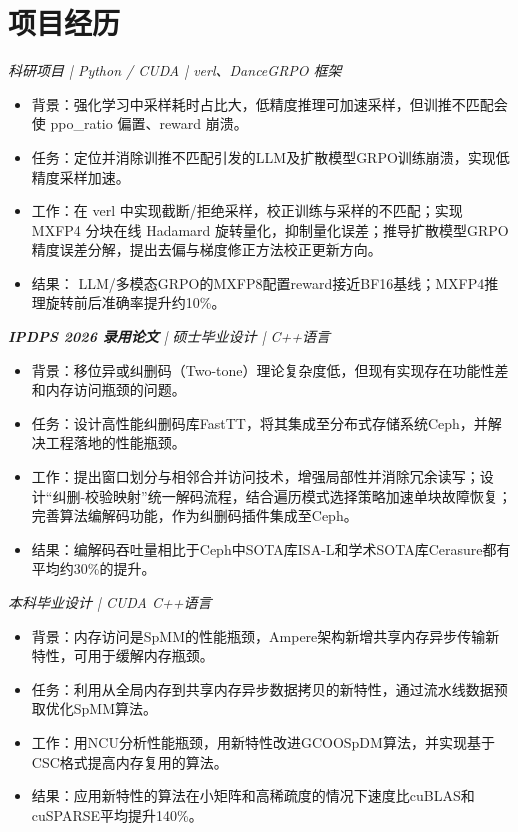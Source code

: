 \documentclass{resume}
\begin{document}
\section{项目经历}
\textit{科研项目 | Python / CUDA | verl、DanceGRPO 框架}
\begin{itemize}
\item 背景：强化学习中采样耗时占比大，低精度推理可加速采样，但训推不匹配会使 ppo\_ratio 偏置、reward 崩溃。
\item 任务：定位并消除训推不匹配引发的LLM及扩散模型GRPO训练崩溃，实现低精度采样加速。
\item 工作：在 verl 中实现截断/拒绝采样，校正训练与采样的不匹配；实现 MXFP4 分块在线 Hadamard 旋转量化，抑制量化误差；推导扩散模型GRPO精度误差分解，提出去偏与梯度修正方法校正更新方向。
\item 结果： LLM/多模态GRPO的MXFP8配置reward接近BF16基线；MXFP4推理旋转前后准确率提升约10\%。
\end{itemize}
\textit{\textbf{IPDPS 2026 录用论文} | 硕士毕业设计 | C++语言}
\begin{itemize}
\item 背景：移位异或纠删码（Two-tone）理论复杂度低，但现有实现存在功能性差和内存访问瓶颈的问题。
\item 任务：设计高性能纠删码库FastTT，将其集成至分布式存储系统Ceph，并解决工程落地的性能瓶颈。
\item 工作：提出窗口划分与相邻合并访问技术，增强局部性并消除冗余读写；设计“纠删-校验映射”统一解码流程，结合遍历模式选择策略加速单块故障恢复；完善算法编解码功能，作为纠删码插件集成至Ceph。
\item 结果：编解码吞吐量相比于Ceph中SOTA库ISA-L和学术SOTA库Cerasure都有平均约30\%的提升。
\end{itemize}
\textit{本科毕业设计 | CUDA C++语言}
\begin{itemize}
  \item 背景：内存访问是SpMM的性能瓶颈，Ampere架构新增共享内存异步传输新特性，可用于缓解内存瓶颈。
  \item 任务：利用从全局内存到共享内存异步数据拷贝的新特性，通过流水线数据预取优化SpMM算法。
  \item 工作：用NCU分析性能瓶颈，用新特性改进GCOOSpDM算法，并实现基于CSC格式提高内存复用的算法。
  \item 结果：应用新特性的算法在小矩阵和高稀疏度的情况下速度比cuBLAS和cuSPARSE平均提升140\%。
\end{itemize}
\end{document}
